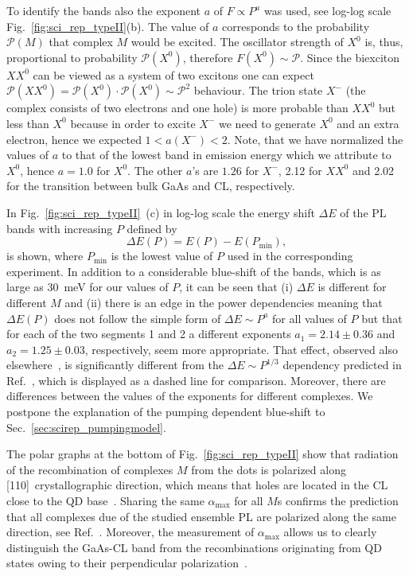 To identify the bands also the exponent $a$ of $F\propto P^a$ was used, see log-log scale Fig.~\ref{fig:sci_rep_typeII}(b). The value of $a$ corresponds to the probability $\mathcal{P}(M)$ that complex $M$ would be excited. The oscillator strength of $X^0$ is, thus, proportional to probability $\mathcal{P}(X^0)$, therefore $F(X^0)\sim \mathcal{P}$. Since the biexciton $XX^0$ can be viewed as a system of two excitons one can expect $\mathcal{P}(XX^0)=\mathcal{P}(X^0)\cdot \mathcal{P}(X^0)\sim \mathcal{P}^2$ behaviour. The trion state $X^-$ (the complex consists of two electrons and one hole) is more probable than $XX^0$ but less than $X^0$ because in order to excite $X^-$ we need to generate $X^0$ and an extra electron, hence we expected $1<a(X^-)<2$. Note, that we have normalized the values of $a$ to that of the lowest band in emission energy which we attribute to $X^0$, hence $a=1.0$ for $X^0$. The other $a$'s are $1.26$ for $X^-$, 2.12 for $XX^0$ and 2.02 for the transition between bulk GaAs and CL, respectively.


In Fig.~\ref{fig:sci_rep_typeII}~(c) in log-log scale the energy shift $\Delta E$ of the PL bands with increasing $P$ defined by
\begin{equation}
\Delta E(P)= E(P) - E(P_\mathrm{min}),
\end{equation}
is shown, where $P_\mathrm{min}$ is the lowest value of $P$ used in the corresponding experiment. In addition to a considerable blue-shift of the bands, which is as large as 30~meV for our values of $P$, it can be seen that (i) $\Delta E$ is different for different $M$ and (ii) there is an edge in the power dependencies meaning that $\Delta E(P)$ 
does not follow the simple form of $\Delta E\sim P^a$ for all values of $P$ but that for each of the two segments 1 and 2 a different exponents $a_1=2.14\pm0.36$ and $a_2=1.25\pm0.03$, respectively, seem more appropriate. That effect, observed also elsewhere~\citep{Muller-Kirsch2001}, is significantly different from the $\Delta E\sim P^{1/3}$ dependency predicted in Ref.~\citep{Hatami1998}, which is displayed as a dashed line for comparison.
Moreover, there are differences between the values of the exponents for different complexes. We postpone the explanation of the pumping dependent blue-shift to Sec.~\ref{sec:scirep_pumpingmodel}.

The polar graphs at the bottom of Fig.~\ref{fig:sci_rep_typeII} show that radiation of the recombination of complexes $M$ from the dots is polarized along [110]~crystallographic direction, which means that holes are located in the CL close to the QD base~\citep{Klenovsky2015}. Sharing the same $\alpha_\mathrm{max}$ for all $M$s confirms the prediction that all complexes due of the studied ensemble PL are polarized along the same direction, see Ref.~\citep{Klenovsky2017}. Moreover, the measurement of $\alpha_\mathrm{max}$ allows us to clearly distinguish the GaAs-CL band from the recombinations originating from QD states owing to their perpendicular polarization~\citep{Alonso-Alvarez2011a}.

